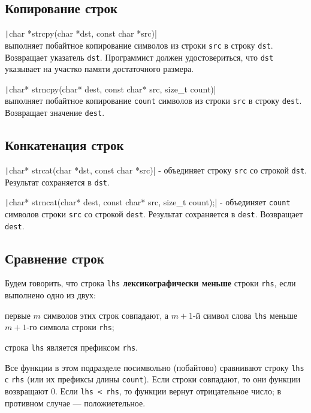 \subsection{Копирование строк}

\texttt|char *strcpy(char *dst, const char *src)|\\
выполняет побайтное копирование символов из строки \verb|src|
в строку \verb|dst|. Возвращает указатель \verb|dst|. Программист должен удостовериться, что \verb|dst| указывает
на участко памяти достаточного размера.

\texttt|char* strncpy(char* dest, const char* src, size_t count)|\\
выполняет побайтное копирование \verb|count| символов из строки \verb|src| в строку \verb|dest|. Возвращает значение
\verb|dest|.

\subsection{Конкатенация строк}
\texttt|char* strcat(char *dst, const char *src)| - объединяет строку \verb|src| со строкой \verb|dst|.
Результат сохраняется в \verb|dst|. 

\texttt|char* strncat(char* dest, const char* src, size_t count);| - объединяет \verb|count|
символов строки \verb|src| со строкой \verb|dest|. Результат сохраняется в \verb|dest|.
Возвращает \verb|dest|.

\subsection{Сравнение строк}
Будем говорить, что строка \verb|lhs| \textbf{лексикографически меньше} \label{def:lex_cmp}
строки \verb|rhs|, если выполнено одно из двух:
\begin{enuminl}
  \item первые $m$ символов этих строк совпадают, а $m+1$-й символ слова \verb|lhs| меньше $m+1$-го символа
  строки \verb|rhs|; \enspace
  \item строка \verb|lhs| является префиксом \verb|rhs|.
\end{enuminl}

Все функции в этом подразделе посимвольно (побайтово) сравнивают строку \verb|lhs|
с \verb|rhs| (или их префиксы длины \verb|count|). Если строки совпадают, то они
функции возвращают 0. Если \verb|lhs < rhs|, то функции вернут отрицательное число;
в противном случае --- положиетельное.

\vspace{0.65cm}

